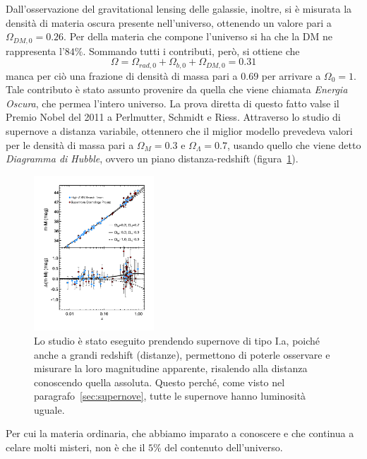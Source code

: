 Dall'osservazione del gravitational lensing delle galassie, inoltre, si è misurata la densità di materia oscura presente nell'universo, ottenendo un valore pari a $\Omega_{DM,0} = 0.26$. Per della materia che compone l'universo si ha che la DM ne rappresenta l'$84\%$. Sommando tutti i contributi, però, si ottiene che
\[
    \Omega = \Omega_{rad,0} + \Omega_{b,0} + \Omega_{DM,0} = 0.31
\]
manca per ciò una frazione di densità di massa pari a $0.69$ per arrivare a $\Omega_0 = 1$. Tale contributo è stato assunto provenire da quella che viene chiamata \textit{Energia Oscura}, che permea l'intero universo. La prova diretta di questo fatto valse il Premio Nobel del 2011 a Perlmutter, Schmidt e Riess. Attraverso lo studio di supernove a distanza variabile, ottennero che il miglior modello prevedeva valori per le densità di massa pari a $\Omega_M = 0.3$ e $\Omega_\Lambda = 0.7$, usando quello che viene detto \textit{Diagramma di Hubble}, ovvero un piano distanza-redshift (figura~\ref{fig:diagramma-hubble}).
\begin{figure}
    \centering
    \includegraphics[width=0.4\textwidth]{immagini/hubble_diagram.png}
    \caption{Lo studio è stato eseguito prendendo supernove di tipo I.a, poiché anche a grandi redshift (distanze), permettono di poterle osservare e misurare la loro magnitudine apparente, risalendo alla distanza conoscendo quella assoluta. Questo perché, come visto nel paragrafo~\ref{sec:supernove}, tutte le supernove hanno luminosità uguale.}\label{fig:diagramma-hubble}
\end{figure}

Per cui la materia ordinaria, che abbiamo imparato a conoscere e che continua a celare molti misteri, non è che il $5\%$ del contenuto dell'universo. 